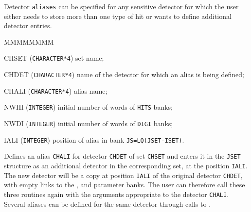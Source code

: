       
       

Detector {\tt aliases} can be specified for any sensitive detector for which
the user either needs to store more than one type of hit
or wants to define additional detector entries.

\begin{DLtt}{MMMMMMMM}
\item[CHSET] ({\tt CHARACTER*4}) set name;
\item[CHDET] ({\tt CHARACTER*4}) name of the detector for which an alias
is being defined;
\item[CHALI] ({\tt CHARACTER*4}) alias name;
\item[NWHI] ({\tt INTEGER}) initial number of words of {\tt HITS} banks;
\item[NWDI] ({\tt INTEGER}) initial number of words of {\tt DIGI} banks;
\item[IALI] ({\tt INTEGER}) position of alias in bank {\tt JS=LQ(JSET-ISET)}.
\end{DLtt}

Defines an alias {\tt CHALI} for detector {\tt CHDET} of set {\tt CHSET} and
enters it in the {\tt JSET} structure as an additional detector in the
corresponding set, at the position {\tt IALI}. The new detector will be
a copy at position {\tt IALI} of the original detector
{\tt CHDET}, with empty links to the ,  and
 parameter banks.
The user can therefore call these three routines again with the
arguments appropriate to the detector {\tt CHALI}.
Several aliases can be defined for
the same detector through calls to .
